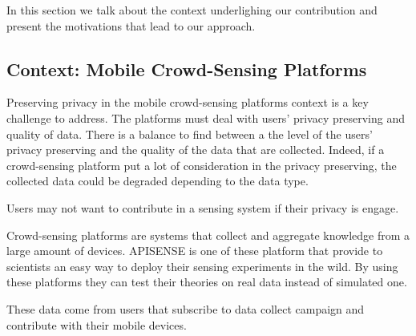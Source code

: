 
In this section we talk about the context underlighing our contribution and present the motivations that lead to our approach.

\subsection{Context: Mobile Crowd-Sensing Platforms}

Preserving privacy in the mobile crowd-sensing platforms context is a key challenge to address.
The platforms must deal with users' privacy preserving and quality of data.
There is a balance to find between a the level of the users' privacy preserving and the quality of the data that are collected.
Indeed, if a crowd-sensing platform put a lot of consideration in the privacy preserving, the collected data could be degraded depending to the data type.



Users may not want to contribute in a sensing system if their privacy is engage.

Crowd-sensing platforms are systems that collect and aggregate knowledge from a large amount of devices.
APISENSE is one of these platform that provide to scientists an easy way to deploy their sensing experiments in the wild. By using these platforms they can test their theories on real data instead of simulated one.



These data come from users that subscribe to data collect campaign and contribute with their mobile devices.



